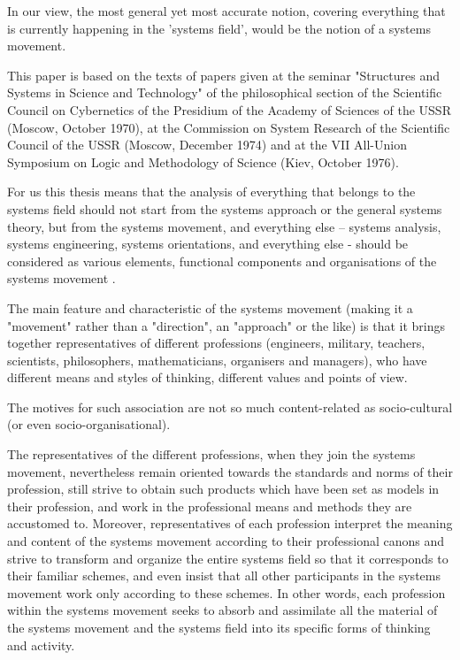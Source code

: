 \documentclass[11pt,a4paper]{article}
\begin{document}
In our view, the most general yet most accurate notion, covering everything
that is currently happening in the 'systems field', would be the notion of a
systems movement.

This paper is based on the texts of papers given at the seminar "Structures
and Systems in Science and Technology" of the philosophical section of the
Scientific Council on Cybernetics of the Presidium of the Academy of Sciences
of the USSR (Moscow, October 1970), at the Commission on System Research of
the Scientific Council of the USSR (Moscow, December 1974) and at the VII
All-Union Symposium on Logic and Methodology of Science (Kiev, October 1976).

For us this thesis means that the analysis of everything that belongs to the
systems field should not start from the systems approach or the general
systems theory, but from the systems movement, and everything else – systems
analysis, systems engineering, systems orientations, and everything else -
should be considered as various elements, functional components and
organisations of the systems movement \cite{Shchedrovitsky1974b}.

The main feature and characteristic of the systems movement (making it a
"movement" rather than a "direction", an "approach" or the like) is that it
brings together representatives of different professions (engineers, military,
teachers, scientists, philosophers, mathematicians, organisers and managers),
who have different means and styles of thinking, different values and points
of view.

The motives for such association are not so much content-related as
socio-cultural (or even socio-organisational).

The representatives of the different professions, when they join the systems
movement, nevertheless remain oriented towards the standards and norms of
their profession, still strive to obtain such products which have been set as
models in their profession, and work in the professional means and methods
they are accustomed to. Moreover, representatives of each profession interpret
the meaning and content of the systems movement according to their
professional canons and strive to transform and organize the entire systems
field so that it corresponds to their familiar schemes, and even insist that
all other participants in the systems movement work only according to these
schemes. In other words, each profession within the systems movement seeks to
absorb and assimilate all the material of the systems movement and the systems
field into its specific forms of thinking and activity.
\end{document}
